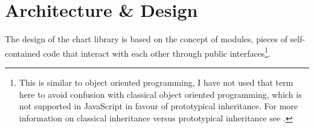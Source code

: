 \chapter{Architecture \& Design}
The design of the chart library is based on the concept of modules, pieces of self-contained code that interact with each other through public interfaces\footnote{This is similar to object oriented programming, I have not used that term here to avoid confusion with classical object oriented programming, which is not supported in JavaScript in favour of prototypical inheritance. For more information on classical inheritance versus prototypical inheritance see 
\cite{crockford08}.}.










